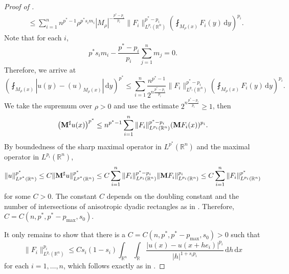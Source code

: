 \documentclass[11pt]{amsart}
\theoremstyle{plain}
\theoremstyle{definition}
\numberwithin{equation}{section}
\newcommand{\R}{\mathbb{R}}
\begin{document}
\begin{proof} [Proof of ]
\begin{equation*}
\begin{split}
&\leq \sum_{i=1}^n n^{{p^{\ast}}-1} \rho^{{p^{\ast}}s_i m_i} |M_{\rho}|^{-\frac{{p^{\ast}}-p_i}{p_i}} \|F_i\|_{L^{p_i}(\mathbb{R}^n)}^{{p^{\ast}}-p_i} \left( \fint_{M_{\rho}(x)} F_i(y) \,\mathrm{d}y \right)^{p_i}.
\end{split}
\end{equation*}
Note that for each $i$,
\begin{equation*}
p^{\ast} s_im_i - \frac{p^{\ast}-p_i}{p_i} \sum_{j=1}^n m_j = 0.
\end{equation*}
Therefore, we arrive at
\begin{equation*}
\left( \fint_{M_\rho(x)} |u(y) - (u)_{M_\rho(x)}|\,\mathrm{d}y \right)^{p^{\ast}} \leq \sum_{i=1}^n \frac{n^{{p^{\ast}}-1}}{2^{n\frac{{p^{\ast}}-p_i}{p_i}}} \|F_i\|_{L^{p_i}(\mathbb{R}^n)}^{{p^{\ast}}-p_i} \left( \fint_{M_{\rho}(x)} F_i(y) \,\mathrm{d}y \right)^{p_i}.
\end{equation*}
We take the supremum over $\rho > 0$ and use the estimate $2^{n\frac{p^{\ast}-p_i}{p_i}} \geq 1$, then
\begin{equation*}
\left( {\bf M}^\sharp u(x) \right)^{p^{\ast}} \leq n^{p^{\ast}-1} \sum_{i=1}^n \|F_i\|_{L^{p_i}(\mathbb{R}^n)}^{{p^{\ast}}-p_i} ({\bf M}F_i(x))^{p_i}.
\end{equation*}
By boundedness of the sharp maximal operator in $L^{p^{\ast}}(\R^n)$ and the maximal operator in $L^{p_i}(\R^n)$,
\begin{equation*}
\|u\|_{L^{p^{\ast}}(\mathbb{R}^n)}^{p^{\ast}} \leq C \|{\bf M}^\sharp u\|_{L^{p^{\ast}}(\mathbb{R}^n)}^{p^{\ast}} \leq C \sum_{i=1}^n \|F_i\|_{L^{p_i}(\mathbb{R}^n)}^{{p^{\ast}}-p_i} \|{\bf M}F_i\|_{L^{p_i}(\R^n)}^{p_i} \leq C \sum_{i=1}^n \|F_i\|_{L^{p_i}(\mathbb{R}^n)}^{p^{\ast}}
\end{equation*}
for some $C > 0$. The constant $C$ depends on the doubling constant and the number of intersections of anisotropic dyadic rectangles as in \cite[Appendix B]{CK}. Therefore, $C = C(n, p^{\ast}, p^{\ast}-p_{\max}, s_0)$.

It only remains to show that there is a $C=C(n,p^{\ast}, p^{\ast}-p_{\max}, s_0)>0$ such that
\begin{equation*}
\|F_i\|_{L^{p_i}(\mathbb{R}^n)}^{p_i} \leq C s_i(1-s_i) \int_{\mathbb{R}^n} \int_{\mathbb{R}} \frac{|u(x)-u(x+he_i)|^{p_i}}{|h|^{1+s_ip_i}} \,\mathrm{d}h \,\mathrm{d}x
\end{equation*}
for each $i=1,\dots, n$, which follows exactly as in \cite[Lemma 2.3 and Theorem 2.4]{CK}.
\end{proof}
\end{document}
